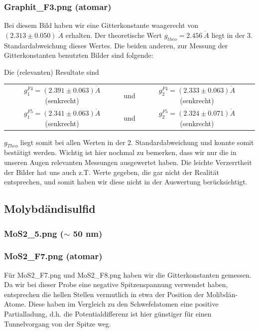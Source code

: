 \subsubsection{Graphit\_F3.png (atomar)}

Bei diesem Bild haben wir eine Gitterkonstante waagerecht von $(2.313 \pm 0.050)\ \mathring{A}$ erhalten. Der theoretische Wert $g_{theo}=2.456\ \mathring A$ liegt in der 3. Standardabweichung dieses Wertes. Die beiden anderen, zur Messung der Gitterkonstanten benutzten Bilder sind folgende:


Die (relevanten) Resultate sind\\

\begin{tabular}{c c c}
	$g^{F4}_1 = (2.391 \pm 0.063) \mathring{A}$ (senkrecht) & und & $g^{F4}_2 = (2.333 \pm 0.063) \mathring{A}$ (senkrecht)\\
	$g^{F5}_1 = (2.341 \pm 0.063) \mathring{A}$ (senkrecht) & und & $g^{F5}_2 = (2.324 \pm 0.071) \mathring{A}$ (senkrecht)\\
\end{tabular}


$g_{Theo}$ liegt somit bei allen Werten in der 2. Standardabweichung und konnte somit bestätigt werden. Wichtig ist hier nochmal zu bemerken, dass wir nur die in unseren Augen relevanten Messungen ausgewertet haben. Die leichte Verzerrtheit der Bilder hat uns auch z.T. Werte gegeben, die gar nicht der Realität entsprechen, und somit haben wir diese nicht in der Auswertung berücksichtigt.

\subsection{Molybdändisulfid}

\subsubsection{MoS2\_5.png ($\sim$ 50 nm)}
\subsubsection{MoS2\_F7.png (atomar)}

Für MoS2\_F7.png und MoS2\_F8.png haben wir die Gitterkonstanten gemessen. Da wir bei dieser Probe eine negative Spitzenspannung verwendet haben, entsprechen die hellen Stellen vermutlich in etwa der Position der Molibdän-Atome. Diese haben im Vergleich zu den Schwefelatomen eine positive Partialladung, d.h. die Potentialdifferenz ist hier günstiger für einen Tunnelvorgang von der Spitze weg.

